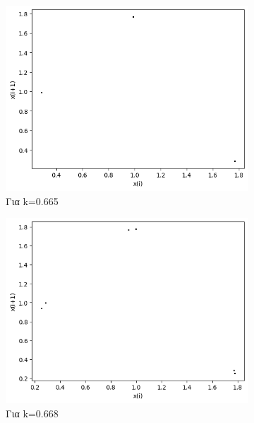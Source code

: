 \begin{figure}
\begin{subfigure}[b]{0.4\textwidth}
		\includegraphics[width=\textwidth]{LateX images/graphs q09/g9}
		\caption{Για k=0.665}
		\label{f:k55}
	\end{subfigure}
	\hfill
	\begin{subfigure}[b]{0.4\textwidth}
		\centering
		\includegraphics[width=\textwidth]{LateX images/graphs q09/g10}
		\caption{Για k=0.668}
		\label{f:k56}
	\end{subfigure}
	\hfill
	\begin{subfigure}[b]{0.4\textwidth}
		\centering

\end{subfigure}
\end{figure}
